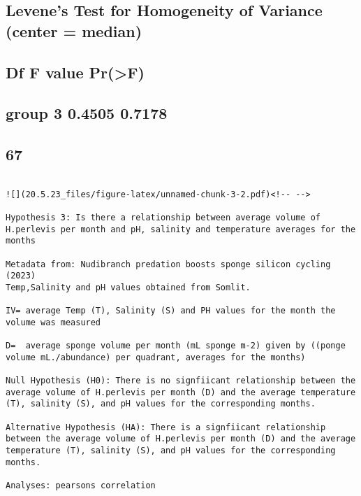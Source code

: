 \documentclass[
]{article}
\begin{document}
\begin{verbatim}
\end{verbatim}

\hypertarget{levenes-test-for-homogeneity-of-variance-center-median}{%
\subsection{Levene's Test for Homogeneity of Variance (center =
median)}\label{levenes-test-for-homogeneity-of-variance-center-median}}

\hypertarget{df-f-value-prf}{%
\subsection{Df F value Pr(\textgreater F)}\label{df-f-value-prf}}

\hypertarget{group-3-0.4505-0.7178}{%
\subsection{group 3 0.4505 0.7178}\label{group-3-0.4505-0.7178}}

\hypertarget{section-21}{%
\subsection{67}\label{section-21}}

\begin{verbatim}

![](20.5.23_files/figure-latex/unnamed-chunk-3-2.pdf)<!-- --> 

Hypothesis 3: Is there a relationship between average volume of H.perlevis per month and pH, salinity and temperature averages for the months 

Metadata from: Nudibranch predation boosts sponge silicon cycling (2023)
Temp,Salinity and pH values obtained from Somlit.

IV= average Temp (T), Salinity (S) and PH values for the month the volume was measured

D=  average sponge volume per month (mL sponge m-2) given by ((ponge volume mL./abundance) per quadrant, averages for the months)

Null Hypothesis (H0): There is no signfiicant relationship between the average volume of H.perlevis per month (D) and the average temperature (T), salinity (S), and pH values for the corresponding months.

Alternative Hypothesis (HA): There is a signfiicant relationship between the average volume of H.perlevis per month (D) and the average temperature (T), salinity (S), and pH values for the corresponding months.

Analyses: pearsons correlation

\end{verbatim}
\end{document}
